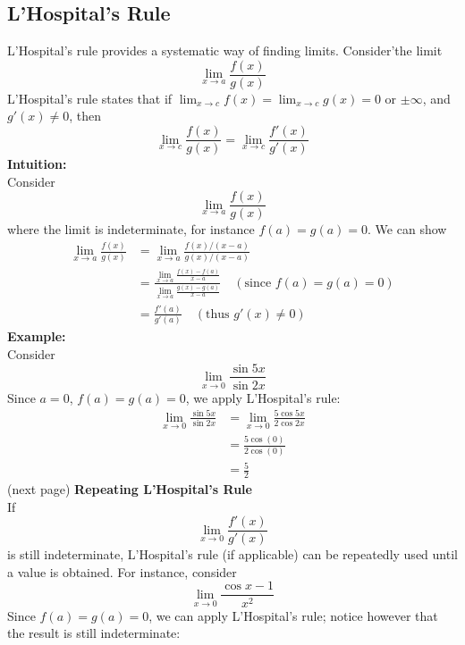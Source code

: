\documentclass{report}
\begin{document}
\subsection{L'Hospital's Rule} %
L'Hospital's rule provides a systematic way of finding limits. Consider'the limit
\begin{equation*}
\lim_{x\to a}\frac{f(x)}{g(x)}
\end{equation*}
L'Hospital's rule states that if $\lim_{x\to c}f(x)=\lim_{x\to c}g(x)=0$ or $\pm\infty$, and $g'(x)\neq0$, then 
\begin{equation*}
\lim_{x\to c}\frac{f(x)}{g(x)}=\lim_{x\to c}\frac{f'(x)}{g'(x)}
\end{equation*}
\textbf{Intuition:}\\
Consider
\begin{equation*}
\lim_{x\to a}\frac{f(x)}{g(x)}
\end{equation*}
where the limit is indeterminate, for instance $f(a)=g(a)=0$. We can show
\begin{align*}
\lim_{x\to a}\frac{f(x)}{g(x)}
&=\lim_{x\to a}\frac{f(x)/(x-a)}{g(x)/(x-a)}\\
&=\frac{\lim_{x\to a}\frac{f(x)-f(a)}{x-a}}{\lim_{x\to a}\frac{g(x)-g(a)}{x-a}}
\quad(\text{since }f(a)=g(a)=0)\\
&=\frac{f'(a)}{g'(a)}\quad(\text{thus }g'(x)\neq0)
\end{align*}
\textbf{Example:}\\
Consider
\begin{equation*}
\lim_{x\to0}\frac{\sin5x}{\sin2x}
\end{equation*}
Since $a=0$, $f(a)=g(a)=0$, we apply L'Hospital's rule:
\begin{align*}
\lim_{x\to0}\frac{\sin5x}{\sin2x}&=\lim_{x\to0}\frac{5\cos5x}{2\cos2x}\\
&=\frac{5\cos(0)}{2\cos(0)}\\
&=\frac{5}{2}
\end{align*}
(next page)
\newpage
\noindent\textbf{Repeating L'Hospital's Rule}\\
If
\begin{equation*}
\lim_{x\to0}\frac{f'(x)}{g'(x)} 
\end{equation*}
is still indeterminate, L'Hospital's rule (if applicable) can be repeatedly used until a value 
is obtained. For instance, consider
\begin{equation*}
\lim_{x\to0}\frac{\cos x-1}{x^2}
\end{equation*}
Since $f(a)=g(a)=0$, we can apply L'Hospital's rule; notice however that the result is still indeterminate:
\end{document}
